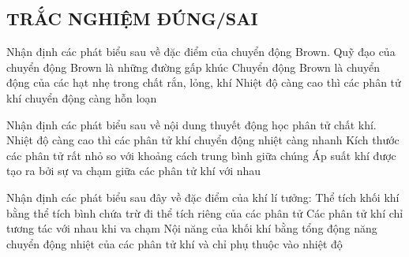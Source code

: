 \subsection{TRẮC NGHIỆM ĐÚNG/SAI}
\setcounter{ex}{0}
\begin{ex}
		Nhận định các phát biểu sau về đặc điểm của chuyển động Brown.
	{\True Quỹ đạo của chuyển động Brown là những đường gấp khúc}
	{Chuyển động Brown là chuyển động của các hạt nhẹ trong chất rắn, lỏng, khí}
	{\True Nhiệt độ càng cao thì các phân tử khí chuyển động càng hỗn loạn}
\end{ex}
\begin{ex}
	Nhận định các phát biểu sau về nội dung thuyết động học phân tử chất khí.
	{\True Nhiệt độ càng cao thì các phân tử khí chuyển động nhiệt càng nhanh}
	{\True Kích thước các phân tử rất nhỏ so với khoảng cách trung bình giữa chúng}
	{Áp suất khí được tạo ra bởi sự va chạm giữa các phân tử khí với nhau}
\end{ex}
\begin{ex}
	Nhận định các phát biểu sau đây về đặc điểm của khí lí tưởng:
	{Thể tích khối khí bằng thể tích bình chứa trừ đi thể tích riêng của các phân tử}
	{\True Các phân tử khí chỉ tương tác với nhau khi va chạm}
	{\True Nội năng của khối khí bằng tổng động năng chuyển động nhiệt của các phân tử khí và chỉ phụ thuộc vào nhiệt độ}
\end{ex}
